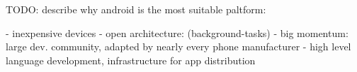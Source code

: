 TODO: describe why android is the most suitable paltform:

- inexpensive devices
- open architecture: (background-tasks)
- big momentum: large dev. community, adapted by nearly every phone manufacturer
- high level language development, infrastructure for app distribution